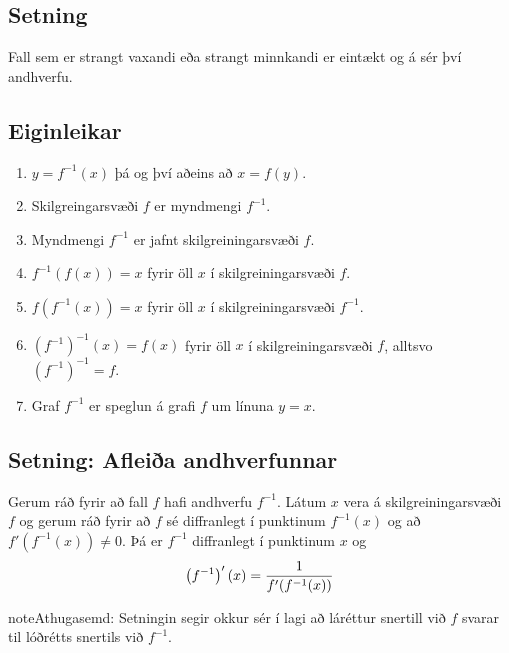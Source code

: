 \documentclass[b5paper,10pt,icelandic]{sphinxmanual}
\begin{document}
\subsection{Setning}
\label{kafli03:id20}
Fall sem er strangt vaxandi eða strangt minnkandi er eintækt og á sér
því andhverfu.


\subsection{Eiginleikar}
\label{kafli03:eiginleikar}\begin{enumerate}
\item {} 
\(y=f^{-1}(x)\) þá og því aðeins að \(x=f(y)\).

\item {} 
Skilgreingarsvæði \(f\) er myndmengi \(f^{-1}\).

\item {} 
Myndmengi \(f^{-1}\) er jafnt skilgreiningarsvæði \(f\).

\item {} 
\(f^{-1}(f(x))=x\) fyrir öll \(x\) í skilgreiningarsvæði
\(f\).

\item {} 
\(f(f^{-1}(x))=x\) fyrir öll \(x\) í skilgreiningarsvæði
\(f^{-1}\).

\item {} 
\((f^{-1})^{-1}(x)=f(x)\) fyrir öll \(x\) í
skilgreiningarsvæði \(f\), alltsvo \((f^{-1})^{-1}=f\).

\item {} 
Graf \(f^{-1}\) er speglun á grafi \(f\) um línuna
\(y=x\).

\end{enumerate}


\subsection{Setning: Afleiða andhverfunnar}
\label{kafli03:index-12}\label{kafli03:setning-afleia-andhverfunnar}
Gerum ráð fyrir að fall \(f\) hafi andhverfu \(f^{-1}\). Látum
\(x\) vera á skilgreiningarsvæði \(f\) og gerum ráð fyrir að
\(f\) sé diffranlegt í punktinum \(f^{-1}(x)\) og að
\(f'(f^{-1}(x))\neq 0\). Þá er \(f^{-1}\) diffranlegt í
punktinum \(x\) og
\begin{gather}
\begin{split}\left(f^{-1}\right)'(x)=\frac{1}{f'(f^{-1}(x))}\end{split}\notag
\end{gather}
\begin{notice}{note}{Athugasemd:}
Setningin segir okkur sér í lagi að láréttur snertill við \(f\)
svarar til lóðrétts snertils við \(f^{-1}\).
\end{notice}
\end{document}

